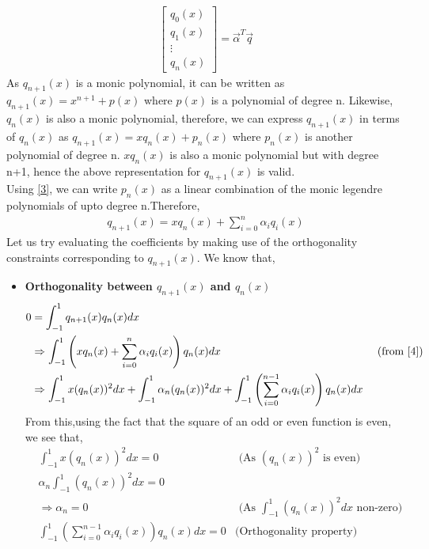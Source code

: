 \documentclass[letterpaper]{exam}
\begin{document}
\begin{questions}
\begin{parts}
\begin{solution}
\begin{align}
\begin{bmatrix}
q_0(x)\\
q_1(x)\\
\vdots \\
q_n(x)
\end{bmatrix} = \overrightarrow{\alpha}^{T}\overrightarrow{q}
\end{align}
As $q_{n+1}(x)$ is a monic polynomial, it can be written as $q_{n+1}(x) = x^{n+1} + p(x)$ where $p(x)$ is a polynomial of degree n. Likewise, $q_n(x)$ is also a monic polynomial, therefore, we can express $q_{n+1}(x)$ in terms of $q_n(x)$ as $q_{n+1}(x) = xq_{n}(x) + p_n(x)$ where $p_n(x)$ is another polynomial of degree n. $xq_{n}(x)$ is also a monic polynomial but with degree n+1, hence the above representation for $q_{n+1}(x)$ is valid.\\
Using \ref{3}, we can write $p_n(x)$ as a linear combination of the monic legendre polynomials of upto degree n.Therefore,
\begin{align}\label{4}
    q_{n+1}(x) = xq_n(x) + \sum_{i=0}^{n} \alpha_{i}q_i(x)
\end{align}
Let us try evaluating the coefficients by making use of the orthogonality constraints corresponding to  $q_{n+1}(x)$. We know that,
\begin{itemize}
    \item \textbf{Orthogonality between $q_{n+1}(x)$ and $q_{n}(x)$}\\
    \begin{align*}
        0 &= \int_{-1}^{1} q_{n+1}(x)q_{n}(x)dx\\
        &\Rightarrow
        \int_{-1}^{1} \left( xq_n(x) + \sum_{i=0}^{n} \alpha_{i}q_i(x)\right) q_{n}(x)dx &\mbox{ (from \ref{4})}\\
        &\Rightarrow 
        \int_{-1}^{1} x(q_n(x))^2dx + \int_{-1}^{1} \alpha_{n}(q_n(x))^2dx + \int_{-1}^{1} \left(\sum_{i=0}^{n-1} \alpha_{i}q_i(x)\right)q_{n}(x)dx
    \end{align*}
    From this,using the fact that the square of an odd or even function is even, we see that,
    \begin{align*}
        & \int_{-1}^{1} x(q_n(x))^2dx  = 0 &\mbox{ (As $(q_n(x))^2$ is even)}\\
        & \alpha_{n}\int_{-1}^{1} (q_n(x))^2dx  = 0\\
        & \Rightarrow
        \alpha_{n} = 0 &\mbox{ (As $\int_{-1}^{1} (q_n(x))^2dx$ non-zero)}\\
        & \int_{-1}^{1} \left(\sum_{i=0}^{n-1} \alpha_{i}q_i(x)\right)q_{n}(x)dx = 0 & \mbox{(Orthogonality property)}

\end{align*}
\end{itemize}
\end{solution}
\end{parts}
\end{questions}
\end{document}
